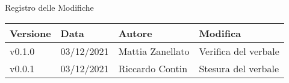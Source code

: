 \begin{center}
  \huge{Registro delle Modifiche}
\end{center}

\begin{center}
  \begin{tabular}{|p{2cm}|p{2cm}|p{3cm}|p{5cm}|}
    \hline
    \textbf{Versione} & \textbf{Data} & \textbf{Autore} & \textbf{Modifica}                    \\ \hline
    v0.1.0            & 03/12/2021    & Mattia Zanellato   & Verifica del verbale \\ \hline
    v0.0.1            & 03/12/2021    & Riccardo Contin    & Stesura del verbale \\ \hline
  \end{tabular}
\end{center}